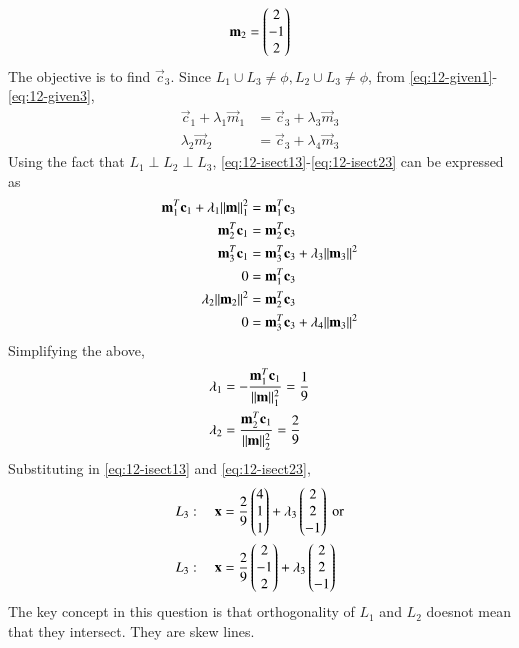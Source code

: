 \documentclass[journal,12pt,twocolumn]{IEEEtran}
\renewcommand\thesection{\arabic{section}}
\begin{document}
\begin{enumerate}[label=\thesection.\arabic*
,ref=\thesection.\theenumi]
\begin{align}
\mathbf{m}_2 = \begin{pmatrix}2 \\-1 \\ 2\end{pmatrix}
\end{align}
The objective is to find $\vec{c}_3$.  Since $L_1 \cup L_3 \ne \phi, L_2 \cup L_3 \ne \phi$, from \eqref{eq:12-given1}-\eqref{eq:12-given3},
\begin{align}
\label{eq:12-isect13}
\vec{c}_1 + \lambda_1 \vec{m}_1 &= \vec{c}_3 + \lambda_3 \vec{m}_3
\\
  \lambda_2 \vec{m}_2 &= \vec{c}_3 + \lambda_4 \vec{m}_3
\label{eq:12-isect23}
\end{align}
%
Using the fact that $L_1\perp L_2\perp L_3$, \eqref{eq:12-isect13}-\eqref{eq:12-isect23} can be expressed as
\begin{align}
\mathbf{m}_1^T\mathbf{c}_1 + \lambda_1 \lVert\mathbf{m}\rVert_1^2 &= \mathbf{m}_1^T\mathbf{c}_3 
\\
\mathbf{m}_2^T\mathbf{c}_1  &= \mathbf{m}_2^T\mathbf{c}_3 
\\
\mathbf{m}_3^T\mathbf{c}_1  &= \mathbf{m}_3^T\mathbf{c}_3 + \lambda_3 \lVert\mathbf{m}_3\rVert^2
\\
0 &= \mathbf{m}_1^T\mathbf{c}_3 
\\
  \lambda_2 \lVert\mathbf{m}_2\rVert^2 &= \mathbf{m}_2^T\mathbf{c}_3 
\\
0 &= \mathbf{m}_3^T\mathbf{c}_3  + \lambda_4 \lVert\mathbf{m}_3\rVert^2
\end{align}
%
Simplifying the above, 
\begin{align}
 \lambda_1  &= -\frac{\mathbf{m}_1^T\mathbf{c}_1}{\lVert\mathbf{m}\rVert_1^2} = \frac{1}{9}
\\
 \lambda_2  &= \frac{\mathbf{m}_2^T\mathbf{c}_1}{\lVert\mathbf{m}\rVert_2^2} =\frac{2}{9}
\end{align}
%
Substituting in \eqref{eq:12-isect13} and \eqref{eq:12-isect23},
\begin{align}
L_3: \quad \mathbf{x} &= \frac{2}{9}\begin{pmatrix}4 \\ 1 \\ 1\end{pmatrix} + \lambda_3\begin{pmatrix}2 \\ 2 \\ -1\end{pmatrix} \text{ or}
\\
L_3: \quad \mathbf{x} &= \frac{2}{9}\begin{pmatrix}2 \\-1 \\ 2\end{pmatrix} + \lambda_3\begin{pmatrix}2 \\ 2 \\ -1\end{pmatrix}
\end{align}
%
The key concept in this question is that orthogonality of $L_1$ and $L_2$ doesnot mean that they intersect.  They are skew lines.
\end{enumerate}
%
\end{document}
